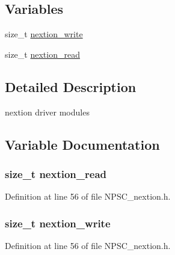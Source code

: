 \subsection*{Variables}
\begin{DoxyCompactItemize}
\item 
size\+\_\+t \hyperlink{group__nextion_ga3d9fa7a3e49782f54b0b3e35aad1674e}{nextion\+\_\+write}
\item 
size\+\_\+t \hyperlink{group__nextion_ga6ddd60ef571fe564fb19fb9d9c1bd064}{nextion\+\_\+read}
\end{DoxyCompactItemize}


\subsection{Detailed Description}
nextion driver modules 



\subsection{Variable Documentation}
\subsubsection[{\texorpdfstring{nextion\+\_\+read}{nextion_read}}]{\setlength{\rightskip}{0pt plus 5cm}size\+\_\+t nextion\+\_\+read}\hypertarget{group__nextion_ga6ddd60ef571fe564fb19fb9d9c1bd064}{}\label{group__nextion_ga6ddd60ef571fe564fb19fb9d9c1bd064}


Definition at line 56 of file N\+P\+S\+C\+\_\+nextion.\+h.

\subsubsection[{\texorpdfstring{nextion\+\_\+write}{nextion_write}}]{\setlength{\rightskip}{0pt plus 5cm}size\+\_\+t nextion\+\_\+write}\hypertarget{group__nextion_ga3d9fa7a3e49782f54b0b3e35aad1674e}{}\label{group__nextion_ga3d9fa7a3e49782f54b0b3e35aad1674e}


Definition at line 56 of file N\+P\+S\+C\+\_\+nextion.\+h.


